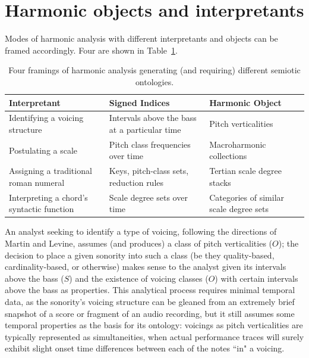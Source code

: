 \section{Harmonic objects and interpretants}
Modes of harmonic analysis with different interpretants and objects can be framed accordingly.  Four are shown in Table~\ref{frames}.
\begin{table}%
  \caption{Four framings of harmonic analysis generating (and requiring) different semiotic ontologies.}
  \centering
\begin{tabular}{>{\raggedright}p{1.6in} |>{\raggedright}p{1.8in} | >{\raggedright\arraybackslash}p{1.7in}}
\hline\hline
Interpretant & Signed Indices & Harmonic Object \\ [0.5ex]
\hline
Identifying a voicing structure & Intervals above the bass at a particular time & Pitch verticalities \\ \hline
Postulating a scale & Pitch class frequencies over time & Macroharmonic collections \\ \hline
Assigning a traditional roman numeral & Keys, pitch-class sets, reduction rules & Tertian scale degree stacks \\ \hline
Interpreting a chord's syntactic function & Scale degree sets over time & Categories of similar scale degree sets \\[1ex]
\hline
\end{tabular}
\label{frames}
\end{table}
An analyst seeking to identify a type of voicing, following the directions of Martin and Levine, assumes (and produces) a class of pitch verticalities ($O$); the decision to place a given sonority into such a class (be they quality-based, cardinality-based, or otherwise) makes sense to the analyst given its intervals above the bass ($S$) and the existence of voicing classes ($O$) with certain intervals above the bass as properties.  This analytical process requires minimal temporal data, as the sonority's voicing structure can be gleaned from an extremely brief snapshot of a score or fragment of an audio recording, but it still assumes some temporal properties as the basis for its ontology: voicings as pitch verticalities are typically represented as simultaneities, when actual performance traces will surely exhibit slight onset time differences between each of the notes ``in" a voicing.

